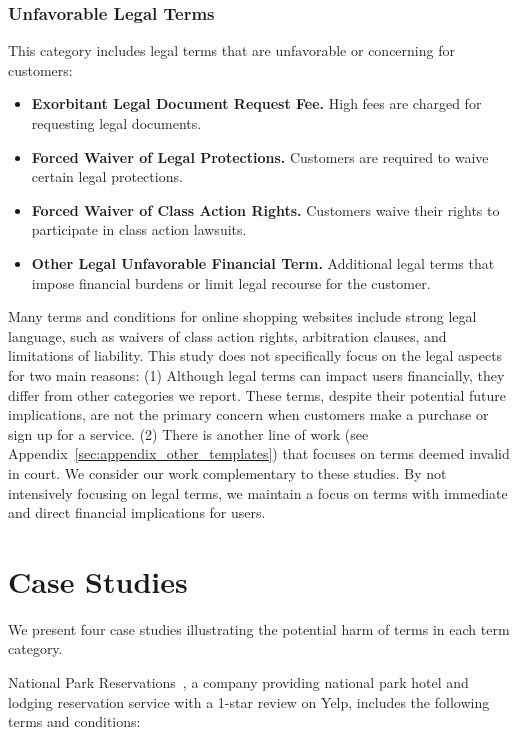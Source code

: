 \subsubsection{Unfavorable Legal Terms}
This category includes legal terms that are unfavorable or concerning for customers:
\begin{itemize}
    \item \textbf{Exorbitant Legal Document Request Fee.} High fees are charged for requesting legal documents.
    \item \textbf{Forced Waiver of Legal Protections.} Customers are required to waive certain legal protections.
    \item \textbf{Forced Waiver of Class Action Rights.} Customers waive their rights to participate in class action lawsuits.
    \item \textbf{Other Legal Unfavorable Financial Term.} Additional legal terms that impose financial burdens or limit legal recourse for the customer.
\end{itemize}




Many terms and conditions for online shopping websites include strong legal language, such as waivers of class action rights, arbitration clauses, and limitations of liability. This study does not specifically focus on the legal aspects for two main reasons: (1) Although legal terms can impact users financially, they differ from other categories we report. These terms, despite their potential future implications, are not the primary concern when customers make a purchase or sign up for a service. (2) There is another line of work (see Appendix~\ref{sec:appendix_other_templates}) that focuses on terms deemed invalid in court. We consider our work complementary to these studies. By not intensively focusing on legal terms, we maintain a focus on terms with immediate and direct financial implications for users.


\section{Case Studies}
\label{sec:case_studies}
We present four case studies illustrating the potential harm of \termname terms in each \termname term category. 


 National Park Reservations~\citep{nationalparkreservations}, a company providing national park hotel and lodging reservation service with a 1-star review on Yelp, includes the following terms and conditions:

